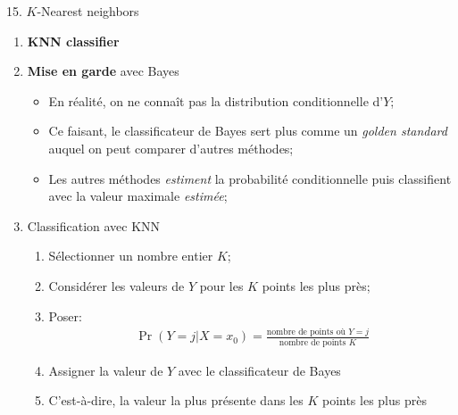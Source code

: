 \documentclass[12pt, titlepage, french]{report}
\begin{document}
\begin{CHPT_SUMM}[label = {PCA-KNN}]{15. $K$-Nearest neighbors}
\begin{enumerate}
\begin{itemize}
		\texttt{[image: src/ISLR-KNN-CLASSIF.png]}	
		\item	Les barrière entre les groupes sont les \textit{Bayes decision boundaries};
		\item[]	Dans le cas de deux classes, il n'en a qu'une seule comme on peut voir;
		\item	On note qu'il y a des mauvaises classifications;
		\item	Puisque le classificateur de Bayes maximise $\Pr(Y = j | X = x_{0})$, le \textit{taux d'erreur de Bayes} est $1 - \underset{j}{\max} \Pr(Y = j | X = x_{0})$;
		\item	En général, le taux d'erreur globale prends la moyenne des probabilités pour toutes les valeurs possible de $X$:
			\begin{align*}
			1 - \text{E}[\underset{j}{\max} \Pr(Y = j | X = x_{0})]
			\end{align*}
		\item	On peut penser au taux d'erreur de Bayes comme l'erreur irréductible en régression;
	\end{itemize}
	\item	\textbf{KNN classifier}
	\item[]	\textbf{Mise en garde} avec Bayes
	\begin{itemize}
		\item	En réalité, on ne connaît pas la distribution conditionnelle d'$Y$;
		\item	Ce faisant, le classificateur de Bayes sert plus comme un \textit{golden standard} auquel on peut comparer d'autres méthodes;
		\item	Les autres méthodes \textit{estiment} la probabilité conditionnelle puis classifient avec la valeur maximale \textit{estimée};
	\end{itemize}
	\item[]	Classification avec KNN
		\begin{enumerate}[label = \roman*.]
		\item	Sélectionner un nombre entier $K$;
		\item	Considérer les valeurs de $Y$ pour les $K$ points les plus près;
		\item	Poser:
			\begin{align*}
			\Pr(Y = j | X = x_{0})	
			=	\frac{\text{nombre de points où } Y = j }{\text{nombre de points } K}
			\end{align*}
		\item	Assigner la valeur de $Y$ avec le classificateur de Bayes
		\item[]	C'est-à-dire, la valeur la plus présente dans les $K$ points les plus près

\end{enumerate}
\end{enumerate}
\end{CHPT_SUMM}
\end{document}
